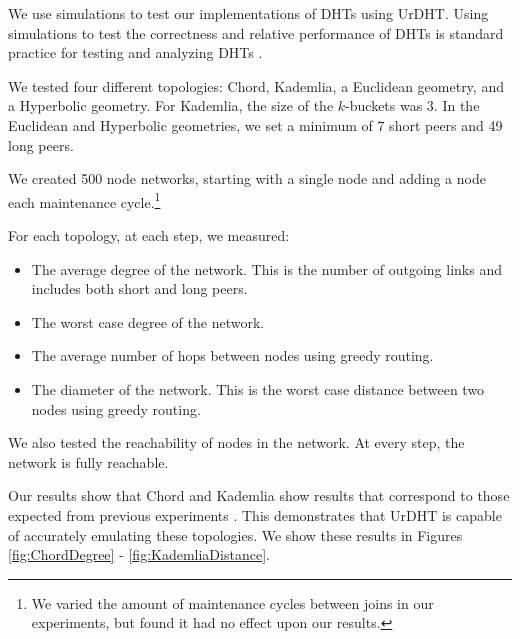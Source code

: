 \documentclass[11pt,conference]{IEEEtran}
\begin{document}
We use simulations to test our implementations of DHTs using UrDHT.
Using simulations to test the correctness and relative performance of DHTs is standard practice for testing and analyzing DHTs \cite{kademlia} \cite{chord} \cite{tapestry} \cite{symphony} \cite{raynet} \cite{li2005comparing}.

%
%
%
%

We tested four different topologies: Chord, Kademlia, a Euclidean geometry, and a Hyperbolic geometry.
For Kademlia, the size of the $k$-buckets was 3.
In the Euclidean and Hyperbolic geometries, we set a minimum of 7 short peers and 49 long peers.

We created 500 node networks, starting with a single node and adding a node each maintenance cycle.\footnote{We varied the amount of maintenance cycles between joins in our experiments, but found it had no effect upon our results.}

For each topology, at each step, we measured:
\begin{itemize}
	\item The average degree of the network.  This is the  number of outgoing links and includes both short and long peers.
	\item The worst case degree of the network.
	\item The average number of hops between nodes using greedy routing.
	\item The diameter of the network.  
	This is the worst case distance between two nodes using greedy routing.
\end{itemize}

We also tested the reachability of nodes in the network.
At every step, the network is fully reachable.

Our results show that Chord and Kademlia show results that correspond to those expected from previous experiments \cite{chord} \cite{kademlia}.
This demonstrates that UrDHT is capable of accurately emulating these topologies.
We show these results in Figures \ref{fig:ChordDegree} - \ref{fig:KademliaDistance}.
\end{document}
